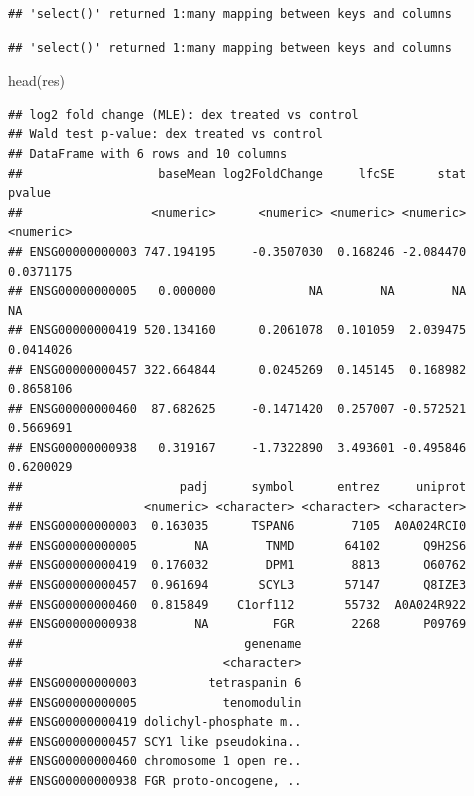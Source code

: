 \documentclass[
]{article}
\newenvironment{Shaded}{\begin{snugshade}}{\end{snugshade}}
\newcommand{\AttributeTok}[1]{\textcolor[rgb]{0.77,0.63,0.00}{#1}}
\newcommand{\FunctionTok}[1]{\textcolor[rgb]{0.00,0.00,0.00}{#1}}
\newcommand{\NormalTok}[1]{#1}
\newcommand{\OtherTok}[1]{\textcolor[rgb]{0.56,0.35,0.01}{#1}}
\newcommand{\SpecialCharTok}[1]{\textcolor[rgb]{0.00,0.00,0.00}{#1}}
\newcommand{\StringTok}[1]{\textcolor[rgb]{0.31,0.60,0.02}{#1}}
\begin{document}
\begin{verbatim}
## 'select()' returned 1:many mapping between keys and columns
\end{verbatim}

\begin{Shaded}
\end{Shaded}

\begin{verbatim}
## 'select()' returned 1:many mapping between keys and columns
\end{verbatim}

\begin{Shaded}
\begin{Highlighting}[]
\FunctionTok{head}\NormalTok{(res)}
\end{Highlighting}
\end{Shaded}

\begin{verbatim}
## log2 fold change (MLE): dex treated vs control 
## Wald test p-value: dex treated vs control 
## DataFrame with 6 rows and 10 columns
##                   baseMean log2FoldChange     lfcSE      stat    pvalue
##                  <numeric>      <numeric> <numeric> <numeric> <numeric>
## ENSG00000000003 747.194195     -0.3507030  0.168246 -2.084470 0.0371175
## ENSG00000000005   0.000000             NA        NA        NA        NA
## ENSG00000000419 520.134160      0.2061078  0.101059  2.039475 0.0414026
## ENSG00000000457 322.664844      0.0245269  0.145145  0.168982 0.8658106
## ENSG00000000460  87.682625     -0.1471420  0.257007 -0.572521 0.5669691
## ENSG00000000938   0.319167     -1.7322890  3.493601 -0.495846 0.6200029
##                      padj      symbol      entrez     uniprot
##                 <numeric> <character> <character> <character>
## ENSG00000000003  0.163035      TSPAN6        7105  A0A024RCI0
## ENSG00000000005        NA        TNMD       64102      Q9H2S6
## ENSG00000000419  0.176032        DPM1        8813      O60762
## ENSG00000000457  0.961694       SCYL3       57147      Q8IZE3
## ENSG00000000460  0.815849    C1orf112       55732  A0A024R922
## ENSG00000000938        NA         FGR        2268      P09769
##                               genename
##                            <character>
## ENSG00000000003          tetraspanin 6
## ENSG00000000005            tenomodulin
## ENSG00000000419 dolichyl-phosphate m..
## ENSG00000000457 SCY1 like pseudokina..
## ENSG00000000460 chromosome 1 open re..
## ENSG00000000938 FGR proto-oncogene, ..
\end{verbatim}
\end{document}
